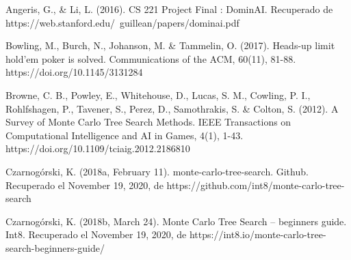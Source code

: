 \documentclass[11pt, oneside]{book}
\begin{document}
\begin{thebibliography}{111}






       Angeris, G., \& Li, L. (2016). CS 221 Project Final :
      DominAI. Recuperado de
      https://web.stanford.edu/~guillean/papers/dominai.pdf

      Bowling, M., Burch, N., Johanson, M. \& Tammelin, O.
      (2017). Heads-up limit hold’em poker is solved. Communications of the ACM,
      60(11), 81-88. https://doi.org/10.1145/3131284

      Browne, C. B., Powley, E., Whitehouse, D., Lucas, S. M.,
      Cowling, P. I., Rohlfshagen, P., Tavener, S., Perez, D., Samothrakis, S. \&
      Colton, S. (2012). A Survey of Monte Carlo Tree Search Methods. IEEE
      Transactions on Computational Intelligence and AI in Games, 4(1), 1-43.
      https://doi.org/10.1109/tciaig.2012.2186810

      Czarnogórski, K. (2018a, February 11).
      monte-carlo-tree-search. Github. Recuperado el November 19, 2020, de
      https://github.com/int8/monte-carlo-tree-search

      Czarnogórski, K. (2018b, March 24). Monte Carlo Tree
      Search – beginners guide. Int8. Recuperado el November 19, 2020, de
      https://int8.io/monte-carlo-tree-search-beginners-guide/


\end{thebibliography}
\end{document}

